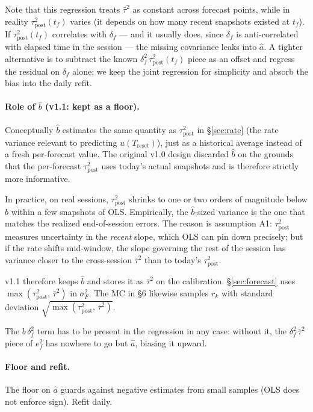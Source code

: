 \documentclass[11pt]{article}
\newcommand{\taupostsq}{\tau_{\text{post}}^2}
\newcommand{\Treset}{T_{\text{reset}}}
\begin{document}
Note that this regression treats $\bar\tau^2$ as constant across forecast
points, while in reality $\taupostsq(t_f)$ varies (it depends on how many
recent snapshots existed at $t_f$). If $\taupostsq(t_f)$ correlates with
$\delta_f$ --- and it usually does, since $\delta_f$ is anti-correlated with
elapsed time in the session --- the missing covariance leaks into $\hat a$.
A tighter alternative is to subtract the known $\delta_f^2\,\taupostsq(t_f)$
piece as an offset and regress the residual on $\delta_f$ alone; we keep
the joint regression for simplicity and absorb the bias into the daily
refit.

\paragraph{Role of $\hat b$ (v1.1: kept as a floor).} Conceptually $\hat b$
estimates the same quantity as $\taupostsq$ in \S\ref{sec:rate} (the rate
variance relevant to predicting $u(\Treset)$), just as a historical average
instead of a fresh per-forecast value. The original v1.0 design discarded
$\hat b$ on the grounds that the per-forecast $\taupostsq$ uses today's
actual snapshots and is therefore strictly more informative.

In practice, on real sessions, $\taupostsq$ shrinks to one or two orders of
magnitude below $\hat b$ within a few snapshots of OLS. Empirically, the
$\hat b$-sized variance is the one that matches the realized end-of-session
errors. The reason is assumption A1: $\taupostsq$ measures uncertainty in
the \emph{recent} slope, which OLS can pin down precisely; but if the rate
shifts mid-window, the slope governing the rest of the session has variance
closer to the cross-session $\bar\tau^2$ than to today's $\taupostsq$.

v1.1 therefore keeps $\hat b$ and stores it as $\bar\tau^2$ on the
calibration. \S\ref{sec:forecast} uses $\max(\taupostsq,\, \bar\tau^2)$ in
$\sigma_F^2$. The MC in \S6 likewise samples $r_k$ with standard deviation
$\sqrt{\max(\taupostsq,\, \bar\tau^2)}$.

The $b\,\delta_f^2$ term has to be present in the regression in any case:
without it, the $\delta_f^2\,\bar\tau^2$ piece of $e_f^2$ has nowhere to go
but $\hat a$, biasing it upward.

\paragraph{Floor and refit.} The floor on $\hat a$ guards against negative
estimates from small samples (OLS does not enforce sign). Refit daily.
\end{document}
